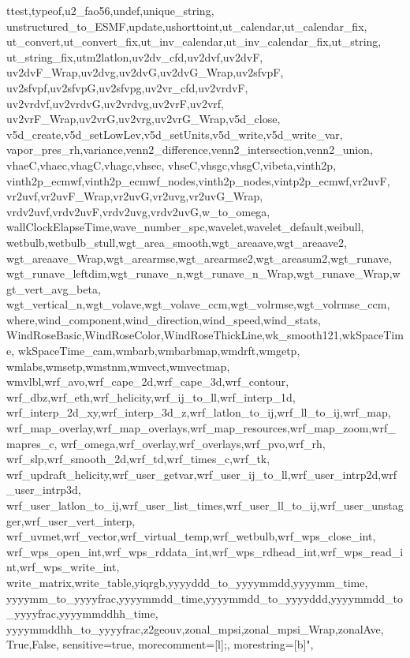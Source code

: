 {{	ttest,typeof,u2_fao56,undef,unique_string,
	unstructured_to_ESMF,update,ushorttoint,ut_calendar,ut_calendar_fix,
	ut_convert,ut_convert_fix,ut_inv_calendar,ut_inv_calendar_fix,ut_string,
	ut_string_fix,utm2latlon,uv2dv_cfd,uv2dvf,uv2dvF,
	uv2dvF_Wrap,uv2dvg,uv2dvG,uv2dvG_Wrap,uv2sfvpF,
	uv2sfvpf,uv2sfvpG,uv2sfvpg,uv2vr_cfd,uv2vrdvF,
	uv2vrdvf,uv2vrdvG,uv2vrdvg,uv2vrF,uv2vrf,
	uv2vrF_Wrap,uv2vrG,uv2vrg,uv2vrG_Wrap,v5d_close,
	v5d_create,v5d_setLowLev,v5d_setUnits,v5d_write,v5d_write_var,
	vapor_pres_rh,variance,venn2_difference,venn2_intersection,venn2_union,
	vhaeC,vhaec,vhagC,vhagc,vhsec,
	vhseC,vhsgc,vhsgC,vibeta,vinth2p,
	vinth2p_ecmwf,vinth2p_ecmwf_nodes,vinth2p_nodes,vintp2p_ecmwf,vr2uvF,
	vr2uvf,vr2uvF_Wrap,vr2uvG,vr2uvg,vr2uvG_Wrap,
	vrdv2uvf,vrdv2uvF,vrdv2uvg,vrdv2uvG,w_to_omega,
	wallClockElapseTime,wave_number_spc,wavelet,wavelet_default,weibull,
	wetbulb,wetbulb_stull,wgt_area_smooth,wgt_areaave,wgt_areaave2,
	wgt_areaave_Wrap,wgt_arearmse,wgt_arearmse2,wgt_areasum2,wgt_runave,
	wgt_runave_leftdim,wgt_runave_n,wgt_runave_n_Wrap,wgt_runave_Wrap,wgt_vert_avg_beta,
	wgt_vertical_n,wgt_volave,wgt_volave_ccm,wgt_volrmse,wgt_volrmse_ccm,
	where,wind_component,wind_direction,wind_speed,wind_stats,
	WindRoseBasic,WindRoseColor,WindRoseThickLine,wk_smooth121,wkSpaceTime,
	wkSpaceTime_cam,wmbarb,wmbarbmap,wmdrft,wmgetp,
	wmlabs,wmsetp,wmstnm,wmvect,wmvectmap,
	wmvlbl,wrf_avo,wrf_cape_2d,wrf_cape_3d,wrf_contour,
	wrf_dbz,wrf_eth,wrf_helicity,wrf_ij_to_ll,wrf_interp_1d,
	wrf_interp_2d_xy,wrf_interp_3d_z,wrf_latlon_to_ij,wrf_ll_to_ij,wrf_map,
	wrf_map_overlay,wrf_map_overlays,wrf_map_resources,wrf_map_zoom,wrf_mapres_c,
	wrf_omega,wrf_overlay,wrf_overlays,wrf_pvo,wrf_rh,
	wrf_slp,wrf_smooth_2d,wrf_td,wrf_times_c,wrf_tk,
	wrf_updraft_helicity,wrf_user_getvar,wrf_user_ij_to_ll,wrf_user_intrp2d,wrf_user_intrp3d,
	wrf_user_latlon_to_ij,wrf_user_list_times,wrf_user_ll_to_ij,wrf_user_unstagger,wrf_user_vert_interp,
	wrf_uvmet,wrf_vector,wrf_virtual_temp,wrf_wetbulb,wrf_wps_close_int,
	wrf_wps_open_int,wrf_wps_rddata_int,wrf_wps_rdhead_int,wrf_wps_read_int,wrf_wps_write_int,
	write_matrix,write_table,yiqrgb,yyyyddd_to_yyyymmdd,yyyymm_time,
	yyyymm_to_yyyyfrac,yyyymmdd_time,yyyymmdd_to_yyyyddd,yyyymmdd_to_yyyyfrac,yyyymmddhh_time,
	yyyymmddhh_to_yyyyfrac,z2geouv,zonal_mpsi,zonal_mpsi_Wrap,zonalAve,
	True,False}, %
	sensitive=true,    %
	morecomment=[l]{;}, %
	morestring=[b]",    %
}